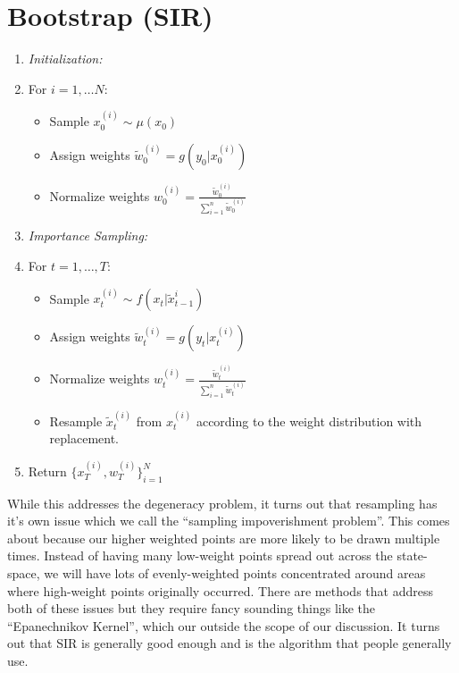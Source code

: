 \documentclass{article}
\begin{document}
\section{Bootstrap (SIR)}
\begin{enumerate}
\item \textit{Initialization:}
\item[] For $i=1,\dots N$:
\begin{itemize}
\item[] Sample $x_0^{(i)} \sim \mu(x_0)$
\item[] Assign weights $\widetilde{w}_0^{(i)} = g(y_0|x_0^{(i)})$
\item[] Normalize weights $w_0^{(i)} = \frac{\widetilde{w}_0^{(i)}}{\sum_{i=1}^{n} \widetilde{w}_0^{(i)}}$
\end{itemize}
\item \textit{Importance Sampling:}
\item[] For $t=1,\dots,T$:
\begin{itemize}
\item[] Sample $x_t^{(i)} \sim f(x_t|\widetilde{x}_{t-1}^{i})$
\item[] Assign weights $\widetilde{w}_t^{(i)} = g(y_t|x_t^{(i)})$
\item[] Normalize weights $w_t^{(i)} = \frac{\widetilde{w}_t^{(i)}}{\sum_{i=1}^{n} \widetilde{w}_t^{(i)}}$
\item[] Resample $\widetilde{x}_t^{(i)}$ from $x_t^{(i)}$ according to the weight distribution with replacement.
\end{itemize}
\item Return $\{x_T^{(i)},w_T^{(i)}\}_{i=1}^N$
\end{enumerate}

While this addresses the degeneracy problem, it turns out that resampling has it's own issue which we call the ``sampling impoverishment problem''. This comes about because our higher weighted points are more likely to be drawn multiple times. Instead of having many low-weight points spread out across the state-space, we will have lots of evenly-weighted points concentrated around areas where high-weight points originally occurred. There are methods that address both of these issues but they require fancy sounding things like the ``Epanechnikov Kernel'', which our outside the scope of our discussion. It turns out that SIR is generally good enough and is the algorithm that people generally use.



\end{document}
